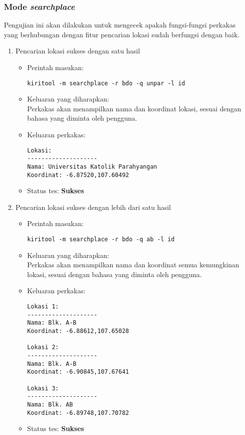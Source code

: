 \subsubsection{Mode \textit{searchplace}}
\label{sec:testing-experiments-testing-searchplace}

Pengujian ini akan dilakukan untuk mengecek apakah fungsi-fungsi perkakas yang berhubungan dengan fitur pencarian lokasi sudah berfungsi dengan baik.

\begin{enumerate}
	\item Pencarian lokasi sukses dengan satu hasil
	\begin{itemize}
		\item Perintah masukan:
		\begin{verbatim}
kiritool -m searchplace -r bdo -q unpar -l id
		\end{verbatim}
		\item Keluaran yang diharapkan: \\
		Perkakas akan menampilkan nama dan koordinat \latlon lokasi, sesuai dengan bahasa yang diminta oleh pengguna.
		\item Keluaran perkakas:
		\begin{lstlisting}
Lokasi:
--------------------
Nama: Universitas Katolik Parahyangan
Koordinat: -6.87520,107.60492
		\end{lstlisting}
		\item Status tes: \textbf{Sukses}
	\end{itemize}
	
	\item Pencarian lokasi sukses dengan lebih dari satu hasil
	\begin{itemize}
		\item Perintah masukan:
		\begin{verbatim}
kiritool -m searchplace -r bdo -q ab -l id
		\end{verbatim}
		\item Keluaran yang diharapkan: \\
		Perkakas akan menampilkan nama dan koordinat \latlon semua kemungkinan lokasi, sesuai dengan bahasa yang diminta oleh pengguna.
		\item Keluaran perkakas:
		\begin{lstlisting}
Lokasi 1:
--------------------
Nama: Blk. A-B
Koordinat: -6.88612,107.65028

Lokasi 2:
--------------------
Nama: Blk. A-B
Koordinat: -6.90845,107.67641

Lokasi 3:
--------------------
Nama: Blk. AB
Koordinat: -6.89748,107.70782
		\end{lstlisting}
		\item Status tes: \textbf{Sukses}
	\end{itemize}
	

\end{enumerate}
